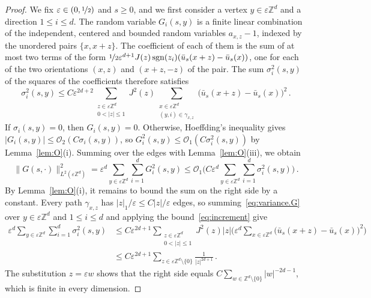 \documentclass[11pt]{amsart}
\numberwithin{equation}{section}
\newcommand{\Z}{\mathbb{Z}}
\newcommand{\cO}{\mathcal{O}}
\newcommand{\eps}{\varepsilon}
\newcommand{\sgn}{\operatorname{sgn}}
\newcommand{\nf}{\nicefrac}
\begin{document}
\begin{proof}
We fix $\eps \in (0, \nf12)$ and $s \geq 0$, and we first consider a vertex $y \in \eps \Z^d$ and a direction $1 \leq i \leq d$.
The random variable $G_i(s, y)$ is a finite linear combination of the independent, centered and bounded random variables $a_{x,z} - 1$, indexed by the unordered pairs $\{x, x+z\}$.
The coefficient of each of them is the sum of at most two terms of the form $\nf12 \eps^{d+1} J(z) \sgn(z_i) (\bar u_s(x+z) - \bar u_s(x))$, one for each of the two orientations $(x,z)$ and $(x+z,-z)$ of the pair.
The sum $\sigma_i^2(s,y)$ of the squares of the coefficients therefore satisfies
\begin{equation} \label{eq:variance.G}
    \sigma_i^2(s,y) \leq C \eps^{2d+2} \sum_{\substack{z \in \eps \Z^d \\ 0 < |z| \leq 1}} J^2(z) \sum_{\substack{x \in \eps \Z^d \\ (y,i) \in \gamma_{x,z}}} \bigl( \bar u_s(x + z) - \bar u_s(x) \bigr)^2\,.
\end{equation}
If $\sigma_i(s,y) = 0$, then $G_i(s,y) = 0$.
Otherwise, Hoeffding's inequality gives $|G_i(s,y)| \leq \cO_2(C \sigma_i(s,y))$, so $G_i^2(s,y) \leq \cO_1(C \sigma_i^2(s,y))$ by Lemma~\ref{lem:O}(i).
Summing over the edges with Lemma~\ref{lem:O}(iii), we obtain
\begin{equation*}
    \|G(s, \cdot)\|_{L^2(\eps \Z^d)}^2 = \eps^d \sum_{y \in \eps \Z^d} \sum_{i=1}^d G_i^2(s,y) \leq \cO_1 \biggl( C \eps^d \sum_{y \in \eps \Z^d} \sum_{i=1}^d \sigma_i^2(s,y) \biggr)\,.
\end{equation*}
By Lemma~\ref{lem:O}(i), it remains to bound the sum on the right side by a constant.
Every path $\gamma_{x,z}$ has $|z|_1/\eps \leq C |z|/\eps$ edges, so summing~\eqref{eq:variance.G} over $y \in \eps \Z^d$ and $1 \leq i \leq d$ and applying the bound~\eqref{eq:increment} give
\begin{align*}
    \eps^d \sum_{y \in \eps \Z^d} \sum_{i=1}^d \sigma_i^2(s,y)
    & \leq C \eps^{2d+1} \sum_{\substack{z \in \eps \Z^d \\ 0 < |z| \leq 1}} J^2(z) |z| \biggl( \eps^d \sum_{x \in \eps \Z^d} \bigl( \bar u_s(x + z) - \bar u_s(x) \bigr)^2 \biggr) \\
    & \leq C \eps^{2d+1} \sum_{z \in \eps \Z^d \setminus \{0\}} \frac{1}{|z|^{2d+1}}\,.
\end{align*}
The substitution $z = \eps w$ shows that the right side equals $C \sum_{w \in \Z^d \setminus \{0\}} |w|^{-2d-1}$, which is finite in every dimension.
\end{proof}
\end{document}
